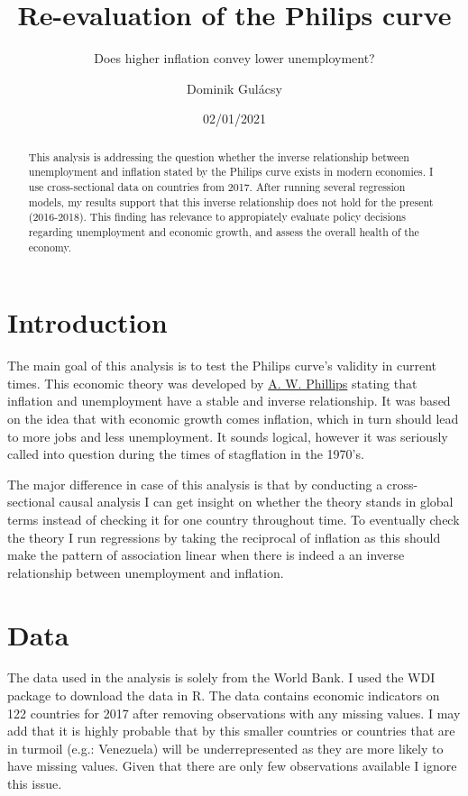 \documentclass[
]{article}
\title{Re-evaluation of the Philips curve}
\subtitle{Does higher inflation convey lower unemployment?}
\author{Dominik Gulácsy}
\date{02/01/2021}
\begin{document}
\maketitle
\begin{abstract}
This analysis is addressing the question whether the inverse
relationship between unemployment and inflation stated by the Philips
curve exists in modern economies. I use cross-sectional data on
countries from 2017. After running several regression models, my results
support that this inverse relationship does not hold for the present
(2016-2018). This finding has relevance to appropiately evaluate policy
decisions regarding unemployment and economic growth, and assess the
overall health of the economy.
\end{abstract}

\hypertarget{introduction}{%
\section{Introduction}\label{introduction}}

The main goal of this analysis is to test the Philips curve's validity
in current times. This economic theory was developed by
\href{https://onlinelibrary.wiley.com/doi/full/10.1111/j.1468-0335.1958.tb00003.x}{A.
W. Phillips} stating that inflation and unemployment have a stable and
inverse relationship. It was based on the idea that with economic growth
comes inflation, which in turn should lead to more jobs and less
unemployment. It sounds logical, however it was seriously called into
question during the times of stagflation in the 1970's.

The major difference in case of this analysis is that by conducting a
cross-sectional causal analysis I can get insight on whether the theory
stands in global terms instead of checking it for one country throughout
time. To eventually check the theory I run regressions by taking the
reciprocal of inflation as this should make the pattern of association
linear when there is indeed a an inverse relationship between
unemployment and inflation.

\hypertarget{data}{%
\section{Data}\label{data}}

The data used in the analysis is solely from the World Bank. I used the
WDI package to download the data in R. The data contains economic
indicators on 122 countries for 2017 after removing observations with
any missing values. I may add that it is highly probable that by this
smaller countries or countries that are in turmoil (e.g.: Venezuela)
will be underrepresented as they are more likely to have missing values.
Given that there are only few observations available I ignore this
issue.
\end{document}
